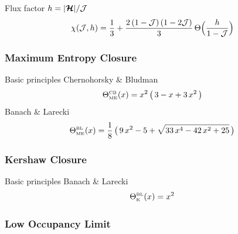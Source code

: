 Flux factor $h=|\boldsymbol{\mathcal{H}}|/\mathcal{J}$
\begin{equation}
  \chi(\mathcal{J},h)=\frac{1}{3}+\frac{2\,(1-\mathcal{J})\,(1-2\mathcal{J})}{3}\,\Theta\Big(\frac{h}{1-\mathcal{J}}\Big)
\end{equation}

\subsubsection{Maximum Entropy Closure}
Basic principles
Chernohorsky \& Bludman \cite{cernohorskyBludman_1994}
\begin{equation}
  \Theta_{\mbox{\tiny ME}}^{\mbox{\tiny CB}}(x)
  =x^{2}\,\big(\,3-x+3\,x^{2}\,\big)
\end{equation}
Banach \& Larecki
\begin{equation}
  \Theta_{\mbox{\tiny ME}}^{\mbox{\tiny BL}}(x)
  =\frac{1}{8}\,\big(\,9\,x^{2}-5+\sqrt{33\,x^{4}-42\,x^{2}+25}\,\big)
\end{equation}

\subsubsection{Kershaw Closure}
Basic principles
Banach \& Larecki \cite{banachLarecki_2017}
\begin{equation}
  \Theta_{\mbox{\tiny K}}^{\mbox{\tiny BL}}(x)=x^{2}
\end{equation}

\subsubsection{Low Occupancy Limit}


